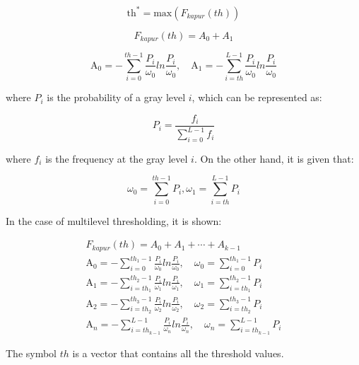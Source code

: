 \documentclass{elsarticle}
\begin{document}
\begin{equation}
\text{th}^* = \text{max}(F_{kapur}(th))
\label{eq3}
\end{equation}

\begin{equation}
F_{kapur}(th) = A_0 + A_1
\label{eq4}
\end{equation}

\begin{equation}
\text{A}_0 = - \sum_{i=0}^{th-1} \frac{P_i}{\omega_0} ln\frac{P_i}{\omega_0}, \quad \text{A}_1 = - \sum_{i=th}^{L-1} \frac{P_i}{\omega_0} ln\frac{P_i}{\omega_0}
\label{eq5}
\end{equation}

\noindent where $P_i$ is the probability of a gray level $i$, which can be represented as:

\begin{equation}
P_i =\frac{f_i}{\sum_{i=0}^{L-1} f_i}   
\label{eq6}
\end{equation}

\noindent where $f_i$ is the frequency at the gray level $i$. On the other hand, it is given that:

\begin{equation}
\omega_0 = \sum_{i=0}^{th-1} P_i ,   \omega_1 = \sum_{i=th}^{L-1} P_i
\label{eq7}
\end{equation}

\noindent In the case of multilevel thresholding, it is shown:

\begin{equation}
\begin{gathered}
F_{kapur}(th) = A_0 + A_1 + \cdots + A_{k-1} \\
\text{A}_0 = - \sum_{i=0}^{th_1-1} \frac{P_i}{\omega_0} ln\frac{P_i}{\omega_0}, \quad \omega_0 = \sum_{i=0}^{th_1-1} P_i  \\
\text{A}_1 = - \sum_{i=th_1}^{th_{2}-1} \frac{P_i}{\omega_1} ln\frac{P_i}{\omega_1}, \quad \omega_1 = \sum_{i=th_1}^{th_{2}-1} P_i \\
\text{A}_2 = - \sum_{i=th_2}^{th_{3}-1} \frac{P_i}{\omega_2} ln\frac{P_i}{\omega_2}, \quad \omega_2 = \sum_{i=th_2}^{th_{3}-1} P_i \\
\text{A}_n = - \sum_{i=th_{k-1}}^{L-1} \frac{P_i}{\omega_n} ln\frac{P_i}{\omega_n}, \quad \omega_n = \sum_{i=th_{k-1}}^{L-1} P_i 
\end{gathered}
\label{eq8}
\end{equation}

\noindent The symbol $th$ is a vector that contains all the threshold values.
\end{document}
